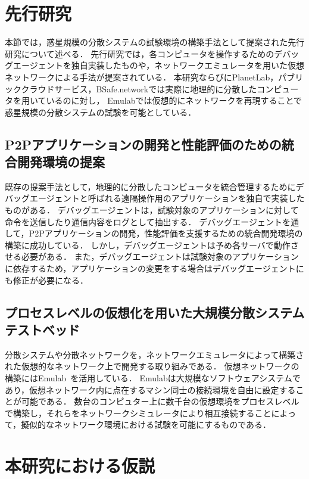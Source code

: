 \section{先行研究}
\label{issue:previous-research}

本節では，惑星規模の分散システムの試験環境の構築手法として提案された先行研究について述べる．
先行研究では，各コンピュータを操作するためのデバッグエージェントを独自実装したものや，ネットワークエミュレータを用いた仮想ネットワークによる手法が提案されている．
本研究ならびにPlanetLab，パブリッククラウドサービス，BSafe.networkでは実際に地理的に分散したコンピュータを用いているのに対し，
Emulabでは仮想的にネットワークを再現することで惑星規模の分散システムの試験を可能としている．

\subsection{P2Pアプリケーションの開発と性能評価のための統合開発環境の提案}

既存の提案手法として，地理的に分散したコンピュータを統合管理するためにデバッグエージェントと呼ばれる遠隔操作用のアプリケーションを独自で実装したものがある．
デバッグエージェントは，試験対象のアプリケーションに対して命令を送信したり通信内容をログとして抽出する．
デバッグエージェントを通して，P2Pアプリケーションの開発，性能評価を支援するための統合開発環境の構築に成功している．
しかし，デバッグエージェントは予め各サーバで動作させる必要がある．
また，デバッグエージェントは試験対象のアプリケーションに依存するため，アプリケーションの変更をする場合はデバッグエージェントにも修正が必要になる．

\subsection{プロセスレベルの仮想化を用いた大規模分散システムテストベッド}
\label{consideration:related-works:emulab}

分散システムや分散ネットワークを，ネットワークエミュレータによって構築された仮想的なネットワーク上で開発する取り組みである．
仮想ネットワークの構築にはEmulab~\cite{Emulab}を活用している．
Emulabは大規模なソフトウェアシステムであり，仮想ネットワーク内に点在するマシン同士の接続環境を自由に設定することが可能である．
数台のコンピュター上に数千台の仮想環境をプロセスレベルで構築し，それらをネットワークシミュレータにより相互接続することによって，擬似的なネットワーク環境における試験を可能にするものである．

\section{本研究における仮説}
\label{issue:hypothesis}

